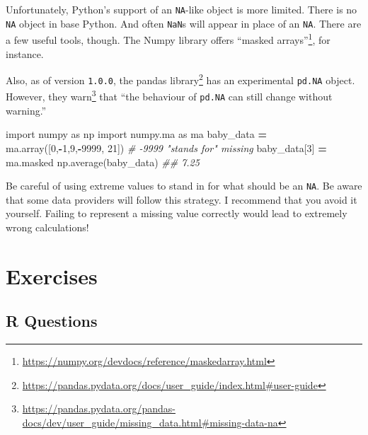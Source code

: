 \documentclass[
  12pt,
  krantz2]{krantz}
\makeatletter
\newenvironment{Shaded}{\begin{snugshade}}{\end{snugshade}}
\newcommand{\CommentTok}[1]{\textcolor[rgb]{0.37,0.37,0.37}{\textit{#1}}}
\newcommand{\DecValTok}[1]{\textcolor[rgb]{0.06,0.06,0.06}{#1}}
\newcommand{\ImportTok}[1]{#1}
\newcommand{\NormalTok}[1]{#1}
\newcommand{\OperatorTok}[1]{\textcolor[rgb]{0.43,0.43,0.43}{\textbf{#1}}}
\renewcommand{\href}[2]{#2\footnote{\url{#1}}}
\newenvironment{kframe}{%
\medskip{}
\setlength{\fboxsep}{.8em}
 \def\at@end@of@kframe{}%
 \ifinner\ifhmode%
  \def\at@end@of@kframe{\end{minipage}}%
  \begin{minipage}{\columnwidth}%
 \fi\fi%
 \def\FrameCommand##1{\hskip\@totalleftmargin \hskip-\fboxsep
 \colorbox{shadecolor}{##1}\hskip-\fboxsep
     \hskip-\linewidth \hskip-\@totalleftmargin \hskip\columnwidth}%
 \MakeFramed {\advance\hsize-\width
   \@totalleftmargin\z@ \linewidth\hsize
   \@setminipage}}%
 {\par\unskip\endMakeFramed%
 \at@end@of@kframe}
\renewenvironment{Shaded}{\begin{kframe}}{\end{kframe}}
\makeatother
\begin{document}
Unfortunately, Python's support of an \texttt{NA}-like object is more limited. There is no \texttt{NA} object in base Python. And often \texttt{NaN}s will appear in place of an \texttt{NA}. There are a few useful tools, though. The Numpy library offers \href{https://numpy.org/devdocs/reference/maskedarray.html}{``masked arrays''}, for instance.

Also, as of version \texttt{1.0.0}, the \href{https://pandas.pydata.org/docs/user_guide/index.html\#user-guide}{pandas library} has an experimental \texttt{pd.NA} object. However, they \href{https://pandas.pydata.org/pandas-docs/dev/user_guide/missing_data.html\#missing-data-na}{warn} that ``the behaviour of \texttt{pd.NA} can still change without warning.''

\begin{Shaded}
\begin{Highlighting}[]
\ImportTok{import}\NormalTok{ numpy }\ImportTok{as}\NormalTok{ np}
\ImportTok{import}\NormalTok{ numpy.ma }\ImportTok{as}\NormalTok{ ma}
\NormalTok{baby\_data }\OperatorTok{=}\NormalTok{ ma.array([}\DecValTok{0}\NormalTok{,}\OperatorTok{{-}}\DecValTok{1}\NormalTok{,}\DecValTok{9}\NormalTok{,}\OperatorTok{{-}}\DecValTok{9999}\NormalTok{, }\DecValTok{21}\NormalTok{]) }\CommentTok{\# {-}9999 "stands for" missing}
\NormalTok{baby\_data[}\DecValTok{3}\NormalTok{] }\OperatorTok{=}\NormalTok{ ma.masked}
\NormalTok{np.average(baby\_data)}
\CommentTok{\#\# 7.25}
\end{Highlighting}
\end{Shaded}

Be careful of using extreme values to stand in for what should be an \texttt{NA}. Be aware that some data providers will follow this strategy. I recommend that you avoid it yourself. Failing to represent a missing value correctly would lead to extremely wrong calculations!

\hypertarget{exercises-1}{%
\section{Exercises}\label{exercises-1}}

\hypertarget{r-questions-1}{%
\subsection{R Questions}\label{r-questions-1}}
\end{document}
